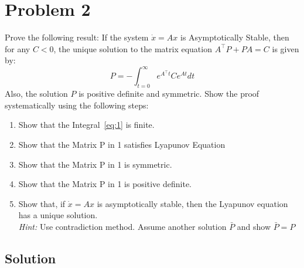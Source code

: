 \section*{Problem 2}

Prove the following result:
If the system \( \dot{x}=A x \) is Asymptotically Stable, then for any \( C<0 \), the unique solution to the matrix equation \( A^{\top} P+P A=C \) is given by:
\begin{equation*}\label{eq:1}
    P=-\int_{t=0}^{\infty} e^{A^{\top} t} C e^{A t} d t \tag{1}
\end{equation*}
Also, the solution \( P \) is positive definite and symmetric.
Show the proof systematically using the following steps:
\begin{enumerate}[label= (\alph*)]
    \item Show that the Integral~\ref{eq:1} is finite.
    \item Show that the Matrix P in 1 satisfies Lyapunov Equation
    \item Show that the Matrix P in 1 is symmetric.
    \item Show that the Matrix P in 1 is positive definite.
    \item Show that, if \( \dot{x}=A x \) is asymptotically stable, then the Lyapunov equation has a unique solution. \\
          \textit{Hint:} Use contradiction method. Assume another solution \( \bar{P} \) and show \( \bar{P}=P \)
\end{enumerate}

\subsection*{Solution}
